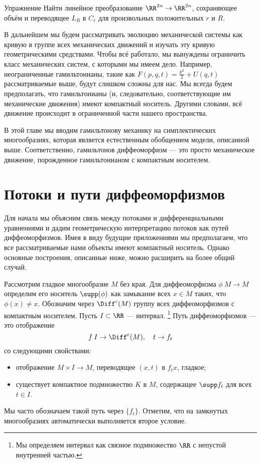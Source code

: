 \begin{thm*}{Упражнение}
Найти линейное преобразование $\RR^{2n} \to \RR^{2n}$, сохраняющее объём и переводящее $L_R$ в $C_r$ для произвольных положительных $r$ и $R$.
\end{thm*}

В дальнейшем мы будем рассматривать эволюцию механической системы как кривую в группе всех механических движений и изучать эту кривую геометрическими средствами.
Чтобы всё работало, мы вынуждены ограничить класс механических систем, с которыми мы имеем дело.
Например, неограниченные гамильтонианы, такие как $F(p,q,t) = \tfrac {p^2}2 + U(q,t)$ рассматриваемые выше, будут слишком сложны для нас.
Мы всегда будем предполагать, что гамильтонианы (и, следовательно, соответствующие им механические движения) имеют компактный носитель.
Другими словами, всё движение происходит в ограниченной части нашего пространства.

В этой главе мы вводим гамильтонову механику на симплектических многообразиях, которая является естественным обобщением модели, описанной выше.
Соответственно, гамильтонов диффеоморфизм --- это просто механическое движение, порожденное гамильтонианом с компактным носителем. 

\section{Потоки и пути диффеоморфизмов}

Для начала мы объясним связь между потоками и дифференциальными уравнениями и дадим геометрическую интерпретацию потоков как путей диффеоморфизмов.
Имея в виду будущие приложениями мы предполагаем, что все рассматриваемые нами объекты имеют компактный носитель.
Однако основные построения, описанные ниже, можно расширить на более общий случай.

Рассмотрим гладкое многообразие $M$ без края.
Для диффеоморфизма $\phi\: M \to M$ определим его носитель $\supp (\phi)$ как замыкание всех  $x \in M$ таких, что $\phi(x) \ne x$.
Обозначим через $\Diff^c (M)$ группу всех диффеоморфизмов с компактным носителем.
Пусть $I \subset \RR$ --- интервал.%
\footnote{Мы определяем интервал как связное подмножество $\RR$ с непустой внутренней частью.}
Путь диффеоморфизмов --- это отображение 
\[f\: I \to \Diff^c (M),\quad t \to f_t\]
со следующими свойствами:
\begin{itemize}
\item отображение $M \times I \to M$, переводящее $(x, t)$ в $f_t x$, гладкое;
\item существует компактное подмножество $K$ в $M$, содержащее $\supp f_t$ для всех $t \in I$.
\end{itemize}
Мы часто обозначаем такой путь через $\{f_t\}$.
Отметим, что на замкнутых многообразиях автоматически выполняется второе условие.

